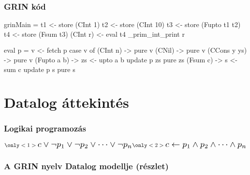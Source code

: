 \documentclass[bigger]{beamer}
\begin{document}
\begin{frame}[fragile]
\frametitle{GRIN kód}

\begin{minipage}{0.4\textwidth}
	
	\begin{haskellcode}
		grinMain = 
		  t1 <- store (CInt 1)
		  t2 <- store (CInt 10)
		  t3 <- store (Fupto t1 t2)
		  t4 <- store (Fsum t3)
		  (CInt r) <- eval t4
		  _prim_int_print r
	\end{haskellcode}
\end{minipage}
\hfill
\begin{minipage}{0.48\textwidth}
	\vspace{1cm}
	\begin{haskellcode}
		eval p = 
		  v <- fetch p
		  case v of
		    (CInt n)     -> pure v
		    (CNil)       -> pure v
		    (CCons y ys) -> pure v
		    (Fupto a b) -> 
		      zs <- upto a b
		      update p zs
		      pure zs
		    (Fsum c) -> 
		      s <- sum c
		      update p s
		      pure s
	\end{haskellcode}
\end{minipage}


\end{frame}

\section{Datalog \'attekint\'es}

\begin{frame}
\frametitle{Logikai programozás}

  \begin{align*}
  	\only<1>{\scalebox{1.5}{$c \lor \neg p_1 \lor \neg p_2 \lor \dots \lor \neg p_n$}}
  	\only<2>{\scalebox{1.5}{$c \leftarrow p_1 \land p_2 \land \dots \land p_n$}}
  \end{align*}

\end{frame}

\begin{frame}
\frametitle{A GRIN nyelv Datalog modellje (részlet)}
\end{frame}
\end{document}

